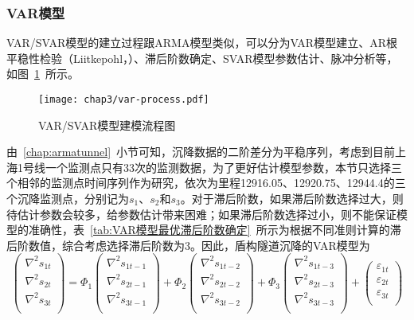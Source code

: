\subsubsection{VAR模型}

VAR/SVAR模型的建立过程跟ARMA模型类似，可以分为VAR模型建立、AR根平稳性检验（Liitkepohl，\citeyear{liitkepohl1991introduction}）、滞后阶数确定、SVAR模型参数估计、脉冲分析等，如图~\ref{fig:VARSVAR模型建模流程图}~所示。

\begin{figure}[htb!]
    \centering
    \texttt{[image: chap3/var-process.pdf]}
    \caption{VAR/SVAR模型建模流程图}
    \label{fig:VARSVAR模型建模流程图}
\end{figure}

由~\ref{chap:armatunnel}~小节可知，沉降数据的二阶差分为平稳序列，考虑到目前上海1号线一个监测点只有33次的监测数据，为了更好估计模型参数，本节只选择三个相邻的监测点时间序列作为研究，依次为里程12916.05、12920.75、12944.4的三个沉降监测点，分别记为$s_1$、$s_2$和$s_3$。对于滞后阶数，如果滞后阶数选择过大，则待估计参数会较多，给参数估计带来困难；如果滞后阶数选择过小，则不能保证模型的准确性，表~\ref{tab:VAR模型最优滞后阶数确定}~所示为根据不同准则计算的滞后阶数值，综合考虑选择滞后阶数为3。因此，盾构隧道沉降的VAR模型为
\begin{equation}
	\left( \begin{matrix}
   {{\nabla }^{2}}{{s}_{1t}}  \\
   {{\nabla }^{2}}{{s}_{2t}}  \\
   {{\nabla }^{2}}{{s}_{3t}}  \\
\end{matrix} \right)={{\Phi }_{1}}\left( \begin{matrix}
   {{\nabla }^{2}}{{s}_{1t-1}}  \\
   {{\nabla }^{2}}{{s}_{2t-1}}  \\
   {{\nabla }^{2}}{{s}_{3t-1}}  \\
\end{matrix} \right)+{{\Phi }_{2}}\left( \begin{matrix}
   {{\nabla }^{2}}{{s}_{1t-2}}  \\
   {{\nabla }^{2}}{{s}_{2t-2}}  \\
   {{\nabla }^{2}}{{s}_{3t-2}}  \\
\end{matrix} \right)+{{\Phi }_{3}}\left( \begin{matrix}
   {{\nabla }^{2}}{{s}_{1t-3}}  \\
   {{\nabla }^{2}}{{s}_{2t-3}}  \\
   {{\nabla }^{2}}{{s}_{3t-3}}  \\
\end{matrix} \right)+\left( \begin{matrix}
   {{\varepsilon }_{1t}}  \\
   {{\varepsilon }_{2t}}  \\
   {{\varepsilon }_{3t}}  \\
\end{matrix} \right) \nonumber
\end{equation}

